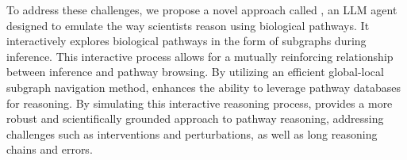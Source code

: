 



To address these challenges, we propose a novel approach called \modelname, an LLM agent designed to emulate the way scientists reason using biological pathways. It interactively explores biological pathways in the form of subgraphs during inference. This interactive process allows for a mutually reinforcing relationship between inference and pathway browsing. By utilizing an efficient global-local subgraph navigation method, \modelname enhances the ability to leverage pathway databases for reasoning. By simulating this interactive reasoning process, \modelname provides a more robust and scientifically grounded approach to pathway reasoning, addressing challenges such as interventions and perturbations, as well as long reasoning chains and errors.





